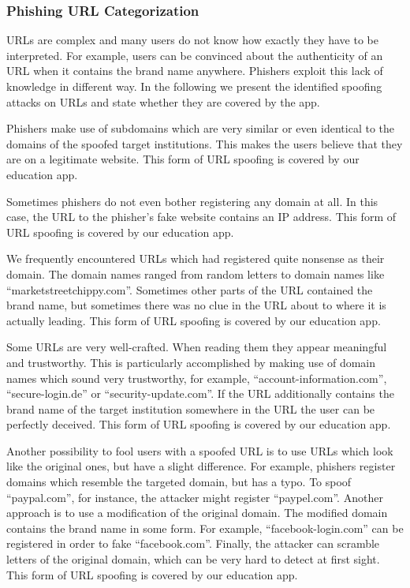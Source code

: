 \subsubsection{Phishing URL Categorization}
URLs are complex and many users do not know how exactly they have to be interpreted. For example, users can be convinced about the authenticity of an URL when it contains the brand name anywhere. Phishers exploit this lack of knowledge in different way. In the following we present the identified spoofing attacks on URLs and state whether they are covered by the app.
\begin{description}[leftmargin=0cm]
	\item[Subdomain] Phishers make use of subdomains which are very similar or even identical to the domains of the spoofed target institutions. This makes the users believe that they are on a legitimate website. This form of URL spoofing is covered by our education app.
	\item[IP Address] Sometimes phishers do not even bother registering any domain at all. In this case, the URL to the phisher's fake website contains an IP address. This form of URL spoofing is covered by our education app.
	\item[Nonsense Domain] We frequently encountered URLs which had registered quite nonsense as their domain. The domain names ranged from random letters to domain names like ``marketstreetchippy.com''. Sometimes other parts of the URL contained the brand name, but sometimes there was no clue in the URL about to where it is actually leading. This form of URL spoofing is covered by our education app.
	\item[Trustworthy, But Unrelated Domain] Some URLs are very well-crafted. When reading them they appear meaningful and trustworthy. This is particularly accomplished by making use of domain names which sound very trustworthy, for example, ``account-information.com'', ``secure-login.de'' or ``security-update.com''. If the URL additionally contains the brand name of the target institution somewhere in the URL the user can be perfectly deceived. This form of URL spoofing is covered by our education app.
	\item[Similar and Deceptive Domains] Another possibility to fool users with a spoofed URL is to use URLs which look like the original ones, but have a slight difference. For example, phishers register domains which resemble the targeted domain, but has a typo. To spoof ``paypal.com'', for instance, the attacker might register ``paypel.com''. Another approach is to use a modification of the original domain. The modified domain contains the brand name in some form. For example, ``facebook-login.com'' can be registered in order to fake ``facebook.com''. Finally, the attacker can scramble letters of the original domain, which can be very hard to detect at first sight. This form of URL spoofing is covered by our education app.

\end{description}
